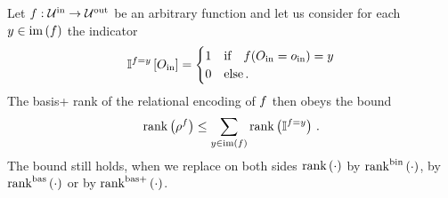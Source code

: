 \begin{theorem}
    Let $f : \mathcal{U}^{\mathrm{in}} \rightarrow \mathcal{U}^{\mathrm{out}}$ be an arbitrary function and let us consider for each $y\in\mathrm{im}\left(f\right)$ the indicator
    \begin{align*}
        \mathbb{I}^{f=y}\left[O_{\mathrm{in}}\right] =
        \begin{cases}
            1 & \text{if} \quad f(O_{\mathrm{in}}=o_{\mathrm{in}})=y \\
            0 & \text{else} \, .
        \end{cases}
    \end{align*}
    The basis+ rank of the relational encoding of $f$ then obeys the bound
    \begin{align*}
        \mathrm{rank}\left(\rho^{f}\right) \leq \sum_{y\in\mathrm{im}\left(f\right)} \mathrm{rank}\left(\mathbb{I}^{f=y} \right) \, .
    \end{align*}
    The bound still holds, when we replace on both sides $\mathrm{rank}\left(\cdot\right)$ by $\mathrm{rank}^{\mathrm{bin}}\left(\cdot\right)$, by $\mathrm{rank}^{\mathrm{bas}}\left(\cdot\right)$ or by $\mathrm{rank}^{\mathrm{bas+}}\left(\cdot\right)$.
\end{theorem}
